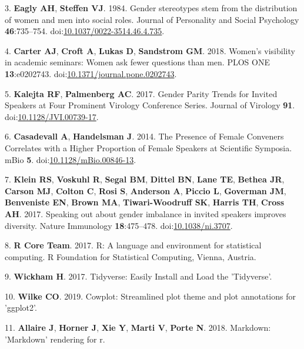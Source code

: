 \documentclass[10pt,]{article}
\begin{document}
\hypertarget{ref-Eagly1984}{}
3. \textbf{Eagly AH}, \textbf{Steffen VJ}. 1984. Gender stereotypes stem
from the distribution of women and men into social roles. Journal of
Personality and Social Psychology \textbf{46}:735--754.
doi:\href{https://doi.org/10.1037/0022-3514.46.4.735}{10.1037/0022-3514.46.4.735}.

\hypertarget{ref-Carter2018}{}
4. \textbf{Carter AJ}, \textbf{Croft A}, \textbf{Lukas D},
\textbf{Sandstrom GM}. 2018. Women's visibility in academic seminars:
Women ask fewer questions than men. PLOS ONE \textbf{13}:e0202743.
doi:\href{https://doi.org/10.1371/journal.pone.0202743}{10.1371/journal.pone.0202743}.

\hypertarget{ref-kalejta_gender_2017}{}
5. \textbf{Kalejta RF}, \textbf{Palmenberg AC}. 2017. Gender Parity
Trends for Invited Speakers at Four Prominent Virology Conference
Series. Journal of Virology \textbf{91}.
doi:\href{https://doi.org/10.1128/JVI.00739-17}{10.1128/JVI.00739-17}.

\hypertarget{ref-casadevall_presence_2014}{}
6. \textbf{Casadevall A}, \textbf{Handelsman J}. 2014. The Presence of
Female Conveners Correlates with a Higher Proportion of Female Speakers
at Scientific Symposia. mBio \textbf{5}.
doi:\href{https://doi.org/10.1128/mBio.00846-13}{10.1128/mBio.00846-13}.

\hypertarget{ref-klein_speaking_2017}{}
7. \textbf{Klein RS}, \textbf{Voskuhl R}, \textbf{Segal BM},
\textbf{Dittel BN}, \textbf{Lane TE}, \textbf{Bethea JR}, \textbf{Carson
MJ}, \textbf{Colton C}, \textbf{Rosi S}, \textbf{Anderson A},
\textbf{Piccio L}, \textbf{Goverman JM}, \textbf{Benveniste EN},
\textbf{Brown MA}, \textbf{Tiwari-Woodruff SK}, \textbf{Harris TH},
\textbf{Cross AH}. 2017. Speaking out about gender imbalance in invited
speakers improves diversity. Nature Immunology \textbf{18}:475--478.
doi:\href{https://doi.org/10.1038/ni.3707}{10.1038/ni.3707}.

\hypertarget{ref-R_software_2017}{}
8. \textbf{R Core Team}. 2017. R: A language and environment for
statistical computing. R Foundation for Statistical Computing, Vienna,
Austria.

\hypertarget{ref-wickham_tidyverse_2017}{}
9. \textbf{Wickham H}. 2017. Tidyverse: Easily Install and Load the
'Tidyverse'.

\hypertarget{ref-cowplot}{}
10. \textbf{Wilke CO}. 2019. Cowplot: Streamlined plot theme and plot
annotations for 'ggplot2'.

\hypertarget{ref-markdown}{}
11. \textbf{Allaire J}, \textbf{Horner J}, \textbf{Xie Y}, \textbf{Marti
V}, \textbf{Porte N}. 2018. Markdown: 'Markdown' rendering for r.
\end{document}
